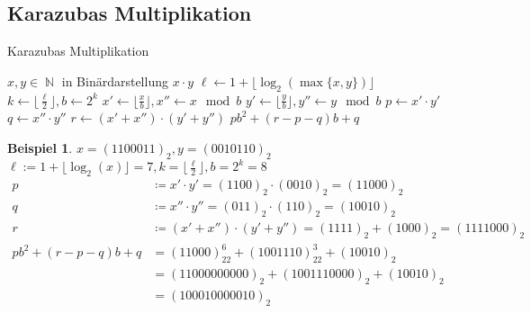 \documentclass[a4paper,12pt]{article}
\DeclareMathOperator{\N}{\mathbb N}
\theoremstyle{definition}
\newtheorem*{example}{Beispiel}
\begin{document}
	\subsection{Karazubas Multiplikation}
	\begin{algorithm}[H]
		\caption{Karazubas Multiplikation}
		\begin{algorithmic}
			\Require $x, y \in \N$ in Binärdarstellung
				\Return $x \cdot y$
			\Else
				\State $\ell \gets 1 + \lfloor \log_2(\max\{x,y\})\rfloor$
				\State $k \gets \lfloor \frac{\ell}{2}\rfloor, b \gets 2^k$
				\State $x' \gets \lfloor \frac{x}{b} \rfloor, x'' \gets x \mod b$
				\State $y' \gets \lfloor \frac{y}{b} \rfloor, y'' \gets y \mod b$
				\State $p \gets x' \cdot y'$
				\State $q \gets x'' \cdot y''$
				\State $r \gets (x' + x'') \cdot (y' + y'')$
				\Return $pb^2 + (r-p-q)b + q$
			\EndIf
		\end{algorithmic}
	\end{algorithm}
	\begin{example}
		$x = (1100011)_2, y = (0010110)_2$\\[2ex]
		$\ell := 1 + \lfloor \log_2(x)\rfloor = 7, k = \lfloor \frac{\ell}{2} \rfloor, b = 2^k = 8$
		\begin{align*}
			p & \coloneq x' \cdot y' = (1100)_2 \cdot (0010)_2 = (11000)_2\\
			q & \coloneq x'' \cdot y'' = (011)_2 \cdot (110)_2 = (10010)_2\\
			r & \coloneq (x' + x'') \cdot (y' + y'') = (1111)_2 + (1000)_2 = (1111000)_2\\
			pb^2 + (r-p-q)b + q &= (11000)_22^6 + (1001110)_22^3 + (10010)_2\\
			&= (11000000000)_2 + (1001110000)_2 + (10010)_2\\
			&= (100010000010)_2
		\end{align*}
	\end{example}
\end{document}
